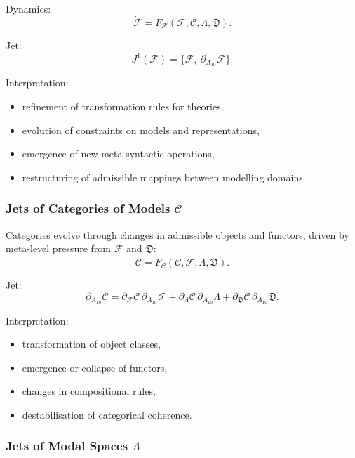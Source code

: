 Dynamics:
\[
\dot{\mathcal{F}}
=
F_{\mathcal{F}}(\mathcal{F},\mathcal{C},\Lambda,\mathfrak{D}).
\]

Jet:
\[
J^1(\mathcal{F})=
\{\dot{\mathcal{F}},\ \partial_{A_{10}}\mathcal{F}\}.
\]

Interpretation:
\begin{itemize}
    \item refinement of transformation rules for theories,
    \item evolution of constraints on models and representations,
    \item emergence of new meta-syntactic operations,
    \item restructuring of admissible mappings between modelling domains.
\end{itemize}


\subsubsection{Jets of Categories of Models $\mathcal{C}$}

Categories evolve through changes in admissible objects and functors,
driven by meta-level pressure from $\mathcal{F}$ and $\mathfrak{D}$:
\[
\dot{\mathcal{C}}
=
F_{\mathcal{C}}(\mathcal{C},\mathcal{F},\Lambda,\mathfrak{D}).
\]

Jet:
\[
\partial_{A_{10}}\mathcal{C}
=
\partial_{\mathcal{F}}\mathcal{C}\,\partial_{A_{10}}\mathcal{F}
+
\partial_{\Lambda}\mathcal{C}\,\partial_{A_{10}}\Lambda
+
\partial_{\mathfrak{D}}\mathcal{C}\,\partial_{A_{10}}\mathfrak{D}.
\]

Interpretation:
\begin{itemize}
    \item transformation of object classes,
    \item emergence or collapse of functors,
    \item changes in compositional rules,
    \item destabilisation of categorical coherence.
\end{itemize}


\subsubsection{Jets of Modal Spaces \texorpdfstring{$\Lambda$}{\Lambda}}

